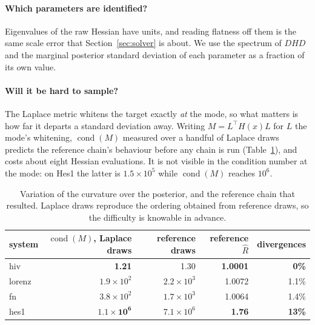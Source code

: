 \documentclass[11pt]{article}
\newcommand{\Rhat}{\widehat{R}}
\theoremstyle{plain}
\theoremstyle{definition}
\theoremstyle{remark}
\begin{document}
\paragraph{Which parameters are identified?} Eigenvalues of the raw Hessian have units, and reading
flatness off them is the same scale error that Section~\ref{sec:solver} is about. We use the
spectrum of $DHD$ and the marginal posterior standard deviation of each parameter as a fraction of
its own value.

\paragraph{Will it be hard to sample?} The Laplace metric whitens the target exactly \emph{at} the
mode, so what matters is how far it departs a standard deviation away. Writing $M = L^\top H(x) L$
for $L$ the mode's whitening, $\operatorname{cond}(M)$ measured over a handful of Laplace draws
predicts the reference chain's behaviour before any chain is run
(Table~\ref{tab:condm}), and costs about eight Hessian evaluations. It is not visible in the
condition number at the mode: on Hes1 the latter is $1.5\times10^5$ while
$\operatorname{cond}(M)$ reaches $10^6$.

\begin{table}[t]
\centering\small
\begin{tabular}{lrrrr}
\toprule
system & $\operatorname{cond}(M)$, Laplace draws & reference draws & reference $\Rhat$ & divergences\\
\midrule
hiv    & \textbf{1.21} & 1.30 & \textbf{1.0001} & \textbf{0\%}\\
lorenz & $1.9\times10^{2}$ & $2.2\times10^{3}$ & 1.0072 & 1.1\%\\
fn     & $3.8\times10^{2}$ & $1.7\times10^{3}$ & 1.0064 & 1.4\%\\
hes1   & $\mathbf{1.1\times10^{6}}$ & $7.1\times10^{6}$ & \textbf{1.76} & \textbf{13\%}\\
\bottomrule
\end{tabular}
\caption{Variation of the curvature over the posterior, and the reference chain that resulted.
Laplace draws reproduce the ordering obtained from reference draws, so the difficulty is knowable
in advance.}
\label{tab:condm}
\end{table}
\end{document}
